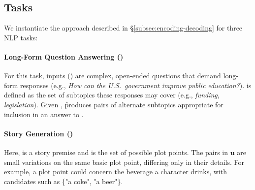 
\subsection{Tasks}
\label{subsec:tasks}
We instantiate the approach described in \S\ref{subsec:encoding-decoding} for three NLP tasks:

\paragraph{Long-Form Question Answering (\qa)} For this task, inputs (\inp) are complex, open-ended questions that demand long-form responses (e.g., \emph{How can the U.S.\ government improve public education?}). \units is defined as the set of subtopics these responses may cover (e.g., \emph{funding}, \emph{legislation}). Given \inp, \f produces pairs of alternate subtopics appropriate for inclusion in an answer to \inp.


\paragraph{Story Generation (\sg)} Here, \inp is a story premise and \units is the set of possible plot points. The pairs in $\mathbf{u}$ are small variations on the same basic plot point, differing only in their details.
For example, a plot point could concern the beverage a character drinks, with candidates such as \{"a coke", "a beer"\}.

